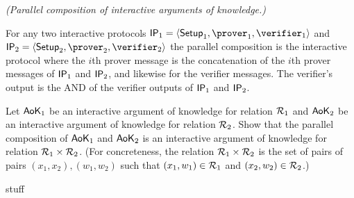 \begin{questions}



 \question \emph{(Parallel composition of interactive arguments of knowledge.)}
 
 For any two interactive protocols $\ip_1 = \langle \Setup_1, \prover_1, \verifier_1 \rangle$ and $\ip_2 = \langle \Setup_2, \prover_2, \verifier_2 \rangle$ the parallel composition is the interactive protocol where the $i$th prover message is the concatenation of the $i$th prover messages of $\mathsf{IP}_1$ and $\mathsf{IP}_2$, and likewise for the verifier messages. The verifier's output is the AND of the verifier outputs of $\mathsf{IP}_1$ and $\mathsf{IP}_2$.
 
 
 Let $\mathsf{AoK}_1$ be an interactive argument of knowledge for relation $\mathcal{R}_1$ and $\mathsf{AoK}_2$ be an interactive argument of knowledge for relation $\mathcal{R}_2$. Show that the parallel composition of $\mathsf{AoK}_1$ and $\mathsf{AoK}_2$ is an interactive argument of knowledge for relation $\mathcal{R}_1 \times \mathcal{R}_2$. (For concreteness, the relation $\mathcal{R}_1 \times \mathcal{R}_2$ is the set of pairs of pairs $(x_1,x_2),(w_1,w_2)$ such that $(x_1,w_1) \in \mathcal{R}_1$ and $(x_2,w_2) \in \mathcal{R}_2$.)



 \begin{solution}
  stuff
 \end{solution}

    
\end{questions}



